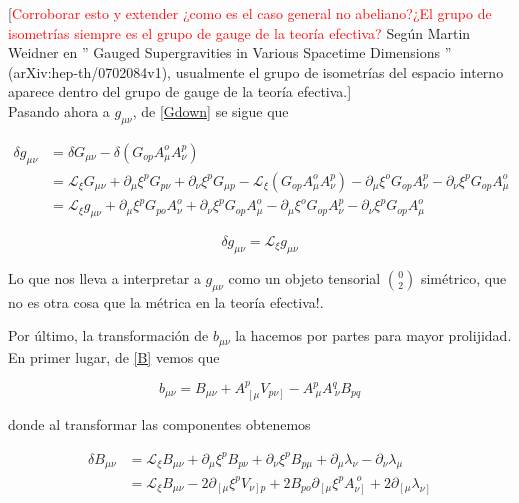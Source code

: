 \documentclass{article}
\numberwithin{equation}{section}
\begin{document}
[\textcolor{red}{Corroborar esto y extender ¿como es el caso general no abeliano?¿El grupo de isometrías siempre es el grupo de gauge de la teoría efectiva?}  Según Martin Weidner en '' Gauged Supergravities in Various
Spacetime Dimensions '' (arXiv:hep-th/0702084v1), usualmente el grupo de isometrías del espacio interno aparece dentro del grupo de gauge de la teoría efectiva.]\\

Pasando ahora a $ g_{\mu \nu} $, de \ref{Gdown} se sigue que

\begin{equation}
\begin{aligned}
\delta g_{\mu \nu} &= \delta G_{\mu \nu} - \delta \left( G_{o p} A^o_\mu A^p_{\nu} \right)\\
&= \mathcal{L}_{\xi} G_{\mu \nu} + \partial_{\mu} \xi^p G_{p \nu} + \partial_{\nu} \xi^p G_{\mu p} - \mathcal{L}_{\xi} \left( G_{o p} A^o_{\mu} A^p_{\nu}\right) -  \partial_{\mu} \xi^o G_{o p} A^p_{\nu} - \partial_{\nu} \xi^p G_{o p}A^o_{\mu}\\
&= \mathcal{L}_{\xi} g_{\mu \nu} + \partial_{\mu} \xi^p G_{p o} A^o_{\nu} + \partial_{\nu} \xi^p G_{o p} A^o_\mu -  \partial_{\mu} \xi^o G_{o p} A^p_{\nu} - \partial_{\nu} \xi^p G_{o p}A^o_{\mu}
\end{aligned}
\end{equation}

\begin{boxquation}\label{g}
	\begin{equation}
	\delta g_{\mu \nu}= \mathcal{L}_{\xi} g_{\mu \nu}
	\end{equation}
\end{boxquation}

Lo que nos lleva a interpretar a $ g_{\mu \nu} $ como un objeto tensorial $ \binom{0}{2} $ simétrico, que no es otra cosa que la métrica en la teoría efectiva!.

Por último, la transformación de $ b_{\mu \nu} $ la hacemos por partes para mayor prolijidad. En primer lugar, de \ref{B} vemos que 

\begin{equation}\label{aux0}
b_{\mu \nu} = B_{\mu \nu} + A^p_{\ \left[\mu \right.} V_{\left. p \nu \right]} - A^p_{\ \mu}A^q_{\ \nu} B_{p q}
\end{equation}

donde al transformar las componentes obtenemos

\begin{equation}\label{aux1}
\begin{aligned}
\delta B_{\mu \nu} &= \mathcal{L}_{\xi} B_{\mu \nu} + \partial_{\mu} \xi^p B_{p \nu} + \partial_{\nu} \xi^p B_{p \mu} + \partial_{\mu} \lambda_{\nu} - \partial_{\nu} \lambda_{\mu}\\
&= \mathcal{L}_{\xi} B_{\mu \nu} - 2 \partial_{\left[\mu \right.} \xi^p V_{\left. \nu \right] p} + 2 B_{p o} \partial_{\left[\mu \right.} \xi^p A_{\left. \nu \right]}^{\ o} + 2 \partial_{\left[\mu \right.} \lambda_{\left. \nu \right]}
\end{aligned}
\end{equation}\\
\end{document}
